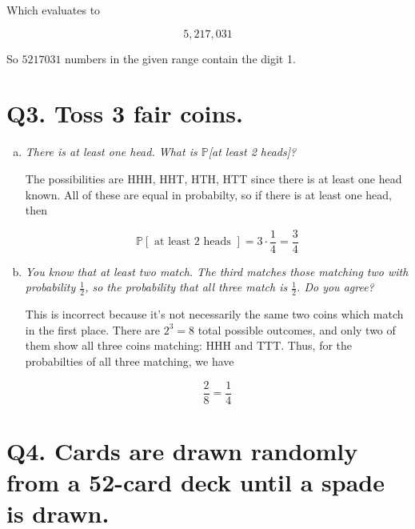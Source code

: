 \documentclass{article}
\begin{document}
Which evaluates to 

$$5, 217, 031$$

So $5217031$ numbers in the given range contain the digit 1.

\section*{Q3. \normalsize Toss 3 fair coins.}

\begin{enumerate}[(a)]
  \item \textit{There is at least one head. What is $\mathbb{P}$[at least 2 heads]?}

    The possibilities are HHH, HHT, HTH, HTT since there is at least one head known. All of these are equal in probabilty, so if there is at least one head, then

    $$\mathbb{P}[\text{ at least 2 heads }] = 3\cdot\frac{1}{4} = \frac{3}{4}$$
  \item \textit{You know that at least two match. The third matches those matching two with probability $\frac{1}{2}$, so the probability that all three match is $\frac{1}{2}$. Do you agree?}

    This is incorrect because it's not necessarily the same two coins which match in the first place. There are $2^3 = 8$ total possible outcomes, and only two of them show all three coins matching: HHH and TTT. Thus, for the probabilties of all three matching, we have

    $$\frac{2}{8} = \frac{1}{4}$$
\end{enumerate}





\section*{Q4. \normalsize Cards are drawn randomly from a 52-card deck until a spade is drawn.}
\end{document}
